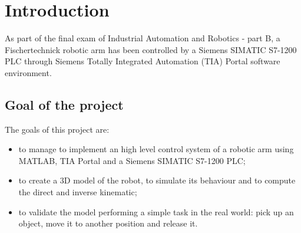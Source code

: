 \chapter{Introduction} \label{1cap:introduction}
As part of the final exam of Industrial Automation and Robotics - part B, a Fischertechnick robotic arm has been controlled by a Siemens SIMATIC S7-1200 PLC through Siemens Totally Integrated Automation (TIA) Portal software environment. %



\section{Goal of the project}
The goals of this project are:
\begin{itemize}
    \item to manage to implement an high level control system of a robotic arm using MATLAB, TIA Portal and a Siemens SIMATIC S7-1200 PLC;
    \item to create a 3D model of the robot, to simulate its behaviour and to compute the direct and inverse kinematic;
    \item to validate the model performing a simple task in the real world: pick up an object, move it to another position and release it.
\end{itemize}